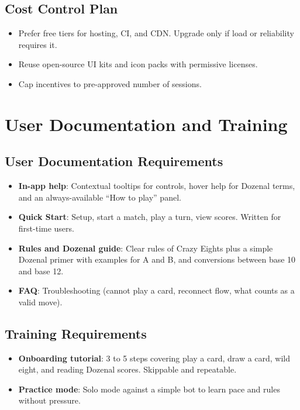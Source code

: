 \documentclass[12pt]{article}
\begin{document}
\subsection{Cost Control Plan}
\begin{itemize}
  \item Prefer free tiers for hosting, CI, and CDN. Upgrade only if load or reliability requires it.
  \item Reuse open-source UI kits and icon packs with permissive licenses.
  \item Cap incentives to pre-approved number of sessions.
\end{itemize}

\section{User Documentation and Training}

\subsection{User Documentation Requirements}
\begin{itemize}
  \item \textbf{In-app help}: Contextual tooltips for controls, hover help for Dozenal terms, and an always-available ``How to play'' panel.
  \item \textbf{Quick Start}: Setup, start a match, play a turn, view scores. Written for first-time users.
  \item \textbf{Rules and Dozenal guide}: Clear rules of Crazy Eights plus a simple Dozenal primer with examples for A and B, and conversions between base 10 and base 12.
  \item \textbf{FAQ}: Troubleshooting (cannot play a card, reconnect flow, what counts as a valid move).
\end{itemize}

\subsection{Training Requirements}
\begin{itemize}
  \item \textbf{Onboarding tutorial}: 3 to 5 steps covering play a card, draw a card, wild eight, and reading Dozenal scores. Skippable and repeatable.
  \item \textbf{Practice mode}: Solo mode against a simple bot to learn pace and rules without pressure.
\end{itemize}
\end{document}
